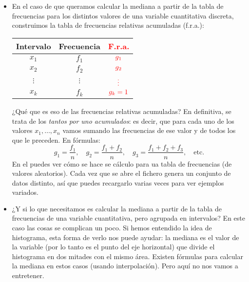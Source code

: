 \begin{itemize}
            \item En el caso de que queramos {\sf calcular la mediana a partir de la tabla de frecuencias para los distintos valores de una variable cuantitativa discreta}, construimos la tabla de frecuencias relativas acumuladas (f.r.a.):
                \begin{center}
                    \begin{tabular}{|c|c|c|}
                    \hline
                    \rule{0cm}{4mm}{\bf Intervalo}&{\bf Frecuencia}&\textcolor{red}{\bf F.r.a.}\\ \hline
                    \rule{0cm}{4mm}$x_1$&$f_1$&$\textcolor{red}{g_1}$\\[2mm] \hline
                    \rule{0cm}{4mm}$x_2$&$f_2$&$\textcolor{red}{g_2}$\\[2mm] \hline
                    $\vdots$&$\vdots$&$\textcolor{red}{\vdots}$\\[2mm] \hline
                    \rule{0cm}{4mm}$x_k$&$f_k$&$\textcolor{red}{g_k=1}$\\[2mm] \hline
                    \end{tabular}
                \end{center}
            ¿Qué que es eso de las frecuencias relativas acumuladas? En definitiva, se trata de los {\em tantos por uno acumulados}: es decir, que para cada uno de los valores $x_1,\ldots, x_n$ vamos sumando las frecuencias de ese valor y {\sf de todos los que le preceden}. En fórmulas:
            \[g_1=\dfrac{f_1}{n},\quad g_2=\dfrac{f_1+f_2}{n},\quad g_3=\dfrac{f_1+f_2+f_3}{n},\quad\mbox{etc.}\]
            En el  puedes ver cómo se hace se cálculo para ua tabla de frecuencias (de valores  aleatorios). Cada vez que se abre el fichero genera un conjunto de datos distinto, así que puedes recargarlo varias veces para ver ejemplos variados.

        \item ¿Y si lo que necesitamos es {\sf calcular la mediana a partir de la tabla de frecuencias de una variable cuantitativa}, pero agrupada en intervalos? En este caso las cosas se complican un poco. Si hemos entendido la idea de histograma, esta forma de verlo nos puede ayudar: la mediana es el valor de la variable (por lo tanto es el punto del eje horizontal) que divide el histograma en dos mitades con el mismo área. Existen fórmulas para calcular la mediana en estos casos (usando interpolación). Pero aquí no nos vamos a entretener.

\end{itemize}

